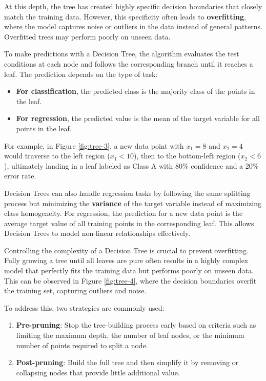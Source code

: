 \documentclass[
]{book}
\providecommand{\tightlist}{%
  \setlength{\itemsep}{0pt}\setlength{\parskip}{0pt}}
\theoremstyle{definition}
\theoremstyle{definition}
\theoremstyle{definition}
\theoremstyle{definition}
\theoremstyle{remark}
\begin{document}
At this depth, the tree has created highly specific decision boundaries that closely match the training data. However, this specificity often leads to \textbf{overfitting}, where the model captures noise or outliers in the data instead of general patterns. Overfitted trees may perform poorly on unseen data.

To make predictions with a Decision Tree, the algorithm evaluates the test conditions at each node and follows the corresponding branch until it reaches a leaf. The prediction depends on the type of task:

\begin{itemize}
\tightlist
\item
  \textbf{For classification}, the predicted class is the majority class of the points in the leaf.
\item
  \textbf{For regression}, the predicted value is the mean of the target variable for all points in the leaf.
\end{itemize}

For example, in Figure \ref{fig:tree-3}, a new data point with \(x_1 = 8\) and \(x_2 = 4\) would traverse to the left region (\(x_1 < 10\)), then to the bottom-left region (\(x_2 < 6\)), ultimately landing in a leaf labeled as Class A with 80\% confidence and a 20\% error rate.

Decision Trees can also handle regression tasks by following the same splitting process but minimizing the \textbf{variance} of the target variable instead of maximizing class homogeneity. For regression, the prediction for a new data point is the average target value of all training points in the corresponding leaf. This allows Decision Trees to model non-linear relationships effectively.

Controlling the complexity of a Decision Tree is crucial to prevent overfitting. Fully growing a tree until all leaves are pure often results in a highly complex model that perfectly fits the training data but performs poorly on unseen data. This can be observed in Figure \ref{fig:tree-4}, where the decision boundaries overfit the training set, capturing outliers and noise.

To address this, two strategies are commonly used:

\begin{enumerate}
\def\labelenumi{\arabic{enumi}.}
\tightlist
\item
  \textbf{Pre-pruning}: Stop the tree-building process early based on criteria such as limiting the maximum depth, the number of leaf nodes, or the minimum number of points required to split a node.\\
\item
  \textbf{Post-pruning}: Build the full tree and then simplify it by removing or collapsing nodes that provide little additional value.
\end{enumerate}
\end{document}
